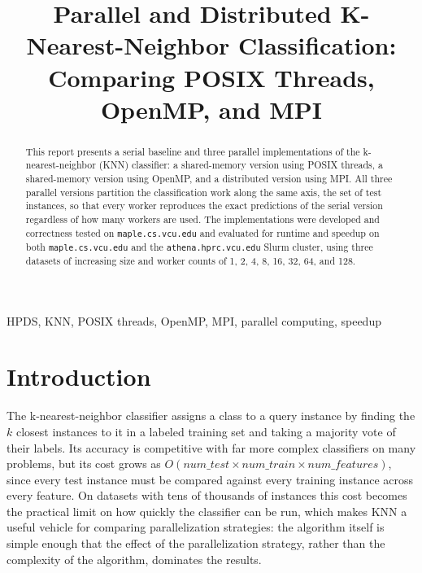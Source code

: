 \documentclass[conference]{IEEEtran}
\begin{document}
\title{Parallel and Distributed K-Nearest-Neighbor Classification: Comparing POSIX Threads, OpenMP, and MPI}

\author{
}

\maketitle

\begin{abstract}
This report presents a serial baseline and three parallel implementations
of the k-nearest-neighbor (KNN) classifier: a shared-memory version using
POSIX threads, a shared-memory version using OpenMP, and a distributed
version using MPI. All three parallel versions partition the classification
work along the same axis, the set of test instances, so that every worker
reproduces the exact predictions of the serial version regardless of how
many workers are used. The implementations were developed and correctness
tested on \texttt{maple.cs.vcu.edu} and evaluated for runtime and speedup on
both \texttt{maple.cs.vcu.edu} and the \texttt{athena.hprc.vcu.edu} Slurm
cluster, using three datasets of increasing size and worker counts of 1, 2,
4, 8, 16, 32, 64, and 128. %
\end{abstract}

\begin{IEEEkeywords}
HPDS, KNN, POSIX threads, OpenMP, MPI, parallel computing, speedup
\end{IEEEkeywords}

\section{Introduction}

The k-nearest-neighbor classifier assigns a class to a query instance by
finding the $k$ closest instances to it in a labeled training set and
taking a majority vote of their labels. Its accuracy is competitive with
far more complex classifiers on many problems, but its cost grows as
$O(\mathit{num\_test} \times \mathit{num\_train} \times
\mathit{num\_features})$, since every test instance must be compared
against every training instance across every feature. On datasets with
tens of thousands of instances this cost becomes the practical limit on
how quickly the classifier can be run, which makes KNN a useful vehicle for
comparing parallelization strategies: the algorithm itself is simple
enough that the effect of the parallelization strategy, rather than the
complexity of the algorithm, dominates the results.
\end{document}
